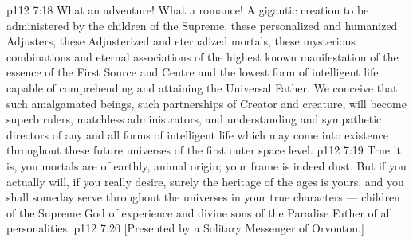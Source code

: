 \vs p112 7:18 What an adventure! What a romance! A gigantic creation to be administered by the children of the Supreme, these personalized and humanized Adjusters, these Adjusterized and eternalized mortals, these mysterious combinations and eternal associations of the highest known manifestation of the essence of the First Source and Centre and the lowest form of intelligent life capable of comprehending and attaining the Universal Father. We conceive that such amalgamated beings, such partnerships of Creator and creature, will become superb rulers, matchless administrators, and understanding and sympathetic directors of any and all forms of intelligent life which may come into existence throughout these future universes of the first outer space level.
\vs p112 7:19 \pc True it is, you mortals are of earthly, animal origin; your frame is indeed dust. But if you actually will, if you really desire, surely the heritage of the ages is yours, and you shall someday serve throughout the universes in your true characters --- children of the Supreme God of experience and divine sons of the Paradise Father of all personalities.
\vsetoff
\vs p112 7:20 [Presented by a Solitary Messenger of Orvonton.]
\quizlink
